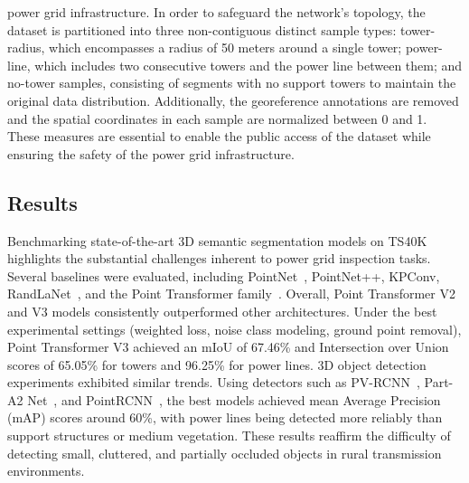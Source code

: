 \begin{enumerate}
            power grid infrastructure. In order to safeguard the network's topology,
            the dataset is partitioned into three non-contiguous distinct sample types:
            tower-radius, which encompasses a radius of 50 meters around a single tower;
            power-line, which includes two consecutive towers and the power line between them;
            and no-tower samples, consisting of segments with no support towers to maintain
            the original data distribution.
            Additionally, the georeference annotations are removed and the spatial
            coordinates in each sample are normalized between 0 and 1.
            These measures are essential to enable the public access of the dataset while
            ensuring the safety of the power grid infrastructure.

\end{enumerate}

\subsection{Results}

Benchmarking state-of-the-art 3D semantic segmentation models on TS40K
highlights the substantial challenges inherent to power grid inspection tasks.
Several baselines were evaluated, including PointNet~\cite{qi2017pointnet},
PointNet++\cite{qi2017pointnet++}, KPConv\cite{thomas2019kpconv},
RandLaNet~\cite{hu2020randla}, and the Point Transformer
family~\cite{zhao2021point}.
%
Overall, Point Transformer V2 and V3 models consistently outperformed other
architectures. Under the best experimental settings (weighted loss, noise class
modeling, ground point removal), Point Transformer V3 achieved an mIoU of
67.46\% and Intersection over Union scores of 65.05\% for towers and 96.25\%
for power lines.
%
3D object detection experiments exhibited similar trends. Using detectors such as
PV-RCNN~\cite{shi2020pv}, Part-A2 Net~\cite{shi2020points}, and
PointRCNN~\cite{shi2019pointrcnn}, the best models achieved mean Average Precision
(mAP) scores around 60\%, with power lines being detected more reliably than support
structures or medium vegetation. These results reaffirm the difficulty of detecting
small, cluttered, and partially occluded objects in rural transmission environments.

